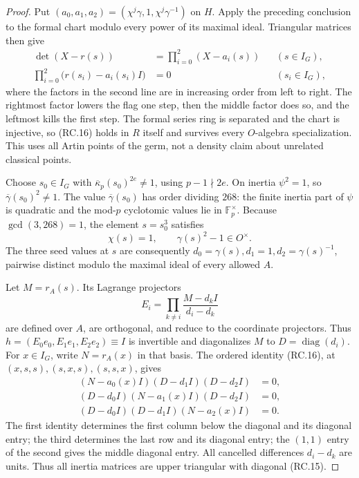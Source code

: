 \begin{proof}
Put \((a_0,a_1,a_2)=(\chi^j\gamma,1,\chi^j\gamma^{-1})\)
on \(H\).  Apply the preceding conclusion to
the formal chart modulo every power of its
maximal ideal.  Triangular matrices then give
\[
\begin{aligned}
 \det(X-r(s))&=\prod_{i=0}^2(X-a_i(s))
                                      &&(s\in I_G),\\
 \prod_{i=0}^2\bigl(r(s_i)-a_i(s_i)I\bigr)&=0
                                      &&(s_i\in I_G),
\end{aligned}
 \tag{RC.16}
\]
where the factors in the second line are in
increasing order from left to right.
The rightmost factor lowers the flag one step,
then the middle factor does so, and the leftmost
kills the first step.  The formal series ring
is separated and the chart is injective, so
(RC.16) holds in \(R\) itself and survives every
\(O\)-algebra specialization.  This uses all
Artin points of the germ, not a density claim
about unrelated classical points.

Choose \(s_0\in I_G\) with
\(\overline\kappa_p(s_0)^{2e}\ne1\), using
\(p-1\nmid2e\).
On inertia \(\psi^2=1\), so
\(\overline\gamma(s_0)^2\ne1\).
The value \(\overline\gamma(s_0)\) has order
dividing \(268\): the finite inertia part of
\(\psi\) is quadratic and the mod-\(p\)
cyclotomic values lie in \(\mathbb F_p^\times\).
Because \(\gcd(3,268)=1\), the element \(s=s_0^3\)
satisfies
\[
 \chi(s)=1,\qquad
              \gamma(s)^2-1\in O^\times.
 \tag{RC.17}
\]
The three seed values at \(s\) are consequently
\(d_0=\gamma(s),d_1=1,d_2=\gamma(s)^{-1}\),
pairwise distinct modulo the maximal ideal of
every allowed \(A\).

Let \(M=r_A(s)\).  Its Lagrange projectors
\[
 E_i=\prod_{k\ne i}\frac{M-d_k I}{d_i-d_k}
 \tag{RC.18}
\]
are defined over \(A\), are orthogonal, and reduce
to the coordinate projectors.  Thus
\(h=(E_0e_0,E_1e_1,E_2e_2)\equiv I\) is invertible
and diagonalizes \(M\) to \(D=\operatorname{diag}(d_i)\).
For \(x\in I_G\), write \(N=r_A(x)\) in that basis.
The ordered identity (RC.16), at
\((x,s,s),(s,x,s),(s,s,x)\), gives
\[
\begin{split}
 (N-a_0(x)I)(D-d_1I)(D-d_2I)&=0,\\
 (D-d_0I)(N-a_1(x)I)(D-d_2I)&=0,\\
 (D-d_0I)(D-d_1I)(N-a_2(x)I)&=0.
\end{split}
 \tag{RC.19}
\]
The first identity determines the first column
below the diagonal and its diagonal entry;
the third determines the last row and its
diagonal entry; the \((1,1)\) entry of the
second gives the middle diagonal entry.
All cancelled differences \(d_i-d_k\) are units.
Thus all inertia matrices are upper triangular
with diagonal (RC.15).


\end{proof}
